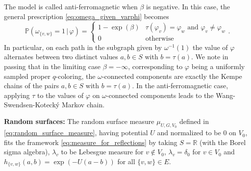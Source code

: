 \documentclass[english]{article}
\renewcommand{\P}{\mathbb{P}}
\theoremstyle{plain}
\theoremstyle{plain}
\begin{document}
The model is called anti-ferromagnetic when $\beta$ is negative. In this case, the general prescription \eqref{eq:omega_given_varphi} becomes
\begin{equation*}
  \P(\omega_{\{v,w\}} = 1\, |\, \varphi) = \begin{cases}
    1 - \exp(\beta) & \tau(\varphi_v) = \varphi_w\text{ and }\varphi_v\neq \varphi_w\\
    0 & \text{otherwise}
  \end{cases}.
\end{equation*}
In particular, on each path in the subgraph given by
$\omega^{-1}(1)$ the value of $\varphi$ alternates between two
distinct values $a,b\in S$ with $b = \tau(a)$. We note in passing
that in the limiting case $\beta = -\infty$, corresponding to
$\varphi$ being a uniformly sampled proper $q$-coloring, the
$\omega$-connected components are exactly the Kempe chains of the
pairs $a,b\in S$ with $b = \tau(a)$. In the anti-ferromagnetic case,
applying $\tau$ to the values of $\varphi$ on $\omega$-connected
components leads to the Wang-Swendsen-Koteck\'y \cite{wang1989antiferromagnetic} Markov
chain.

{\bf Random surfaces:} The random surface measure $\mu_{U,G,V_0}$
defined in \eqref{eq:random_surface_measure}, having potential $U$
and normalized to be $0$ on $V_0$, fits the framework
\eqref{eq:measure_for_reflections} by taking $S = \mathbb{R}$ (with
the Borel sigma algebra), $\lambda_v$ to be Lebesgue measure for
$v\notin V_0$, $\lambda_v = \delta_0$ for $v\in V_0$ and
$h_{\{v,w\}}(a,b) = \exp(-U(a-b))$ for all $\{v,w\}\in E$.
\end{document}
